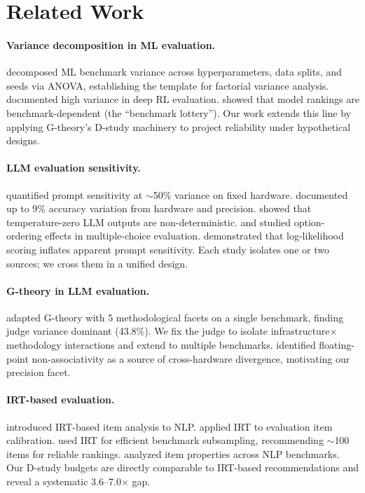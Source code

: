 \documentclass[11pt,letterpaper]{article}
\begin{document}
\section{Related Work}

\paragraph{Variance decomposition in ML evaluation.}
\citet{bouthillier2021accounting} decomposed ML benchmark variance across hyperparameters, data splits, and seeds via ANOVA, establishing the template for factorial variance analysis.
\citet{henderson2018deep} documented high variance in deep RL evaluation.
\citet{dehghani2021benchmark} showed that model rankings are benchmark-dependent (the ``benchmark lottery'').
Our work extends this line by applying G-theory's D-study machinery to project reliability under hypothetical designs.

\paragraph{LLM evaluation sensitivity.}
\citet{mizrahi2024brittlebench} quantified prompt sensitivity at $\sim$50\% variance on fixed hardware.
\citet{yuan2025hardware} documented up to 9\% accuracy variation from hardware and precision.
\citet{gruver2025thinkingmachines} showed that temperature-zero LLM outputs are non-deterministic.
\citet{pezeshkpour2024ordering} and \citet{lu2022fantastically} studied option-ordering effects in multiple-choice evaluation.
\citet{hua2025generation} demonstrated that log-likelihood scoring inflates apparent prompt sensitivity.
Each study isolates one or two sources; we cross them in a unified design.

\paragraph{G-theory in LLM evaluation.}
\citet{mesting2026generalizability} adapted G-theory with 5 methodological facets on a single benchmark, finding judge variance dominant (43.8\%).
We fix the judge to isolate infrastructure$\times$methodology interactions and extend to multiple benchmarks.
\citet{messina2026numerical} identified floating-point non-associativity as a source of cross-hardware divergence, motivating our precision facet.

\paragraph{IRT-based evaluation.}
\citet{lalor2019irt} introduced IRT-based item analysis to NLP.
\citet{rodriguez2021irt} applied IRT to evaluation item calibration.
\citet{polo2024tinybenchmarks} used IRT for efficient benchmark subsampling, recommending $\sim$100 items for reliable rankings.
\citet{vania2021irt} analyzed item properties across NLP benchmarks.
Our D-study budgets are directly comparable to IRT-based recommendations and reveal a systematic 3.6--7.0$\times$ gap.
\end{document}
